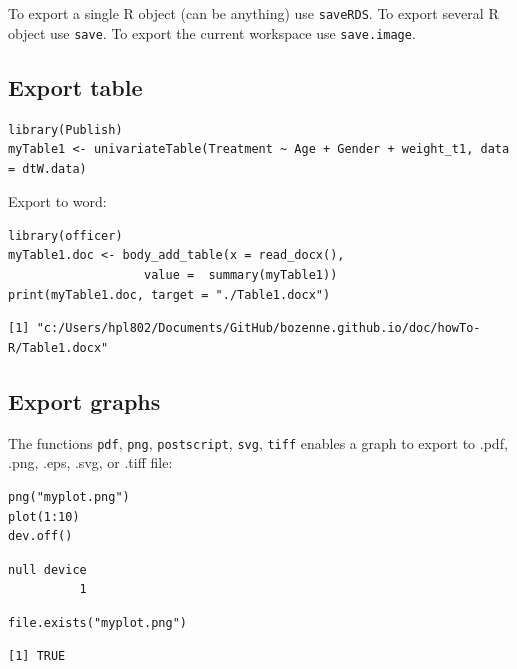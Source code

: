 \documentclass{article}
\begin{document}
To export a single R object (can be anything) use \texttt{saveRDS}.
To export several R object use \texttt{save}.
To export the current workspace use \texttt{save.image}.

\subsection{Export table}
\label{sec:org573a8ed}

\lstset{language=r,label= ,caption= ,captionpos=b,numbers=none}
\begin{lstlisting}
library(Publish)
myTable1 <- univariateTable(Treatment ~ Age + Gender + weight_t1, data = dtW.data)
\end{lstlisting}

Export to word:
\lstset{language=r,label= ,caption= ,captionpos=b,numbers=none}
\begin{lstlisting}
library(officer)
myTable1.doc <- body_add_table(x = read_docx(), 
			       value =  summary(myTable1)) 
print(myTable1.doc, target = "./Table1.docx")
\end{lstlisting}

\begin{verbatim}
[1] "c:/Users/hpl802/Documents/GitHub/bozenne.github.io/doc/howTo-R/Table1.docx"
\end{verbatim}

\subsection{Export graphs}
\label{sec:orgb93ed8e}

The functions \texttt{pdf}, \texttt{png}, \texttt{postscript}, \texttt{svg}, \texttt{tiff} enables a graph to
export to .pdf, .png, .eps, .svg, or .tiff file:
\lstset{language=r,label= ,caption= ,captionpos=b,numbers=none}
\begin{lstlisting}
png("myplot.png")
plot(1:10)
dev.off()
\end{lstlisting}

\begin{verbatim}
null device 
          1
\end{verbatim}

\lstset{language=r,label= ,caption= ,captionpos=b,numbers=none}
\begin{lstlisting}
file.exists("myplot.png")
\end{lstlisting}

\begin{verbatim}
[1] TRUE
\end{verbatim}
\end{document}
